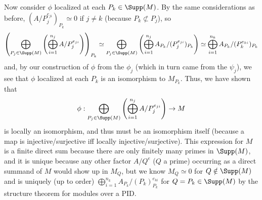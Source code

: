 \documentclass[11pt]{article}
\begin{document}
Now consider $\phi$ localized at each $P_k\in\Supp(M)$. By the same considerations as before, $(A/P_j^{e_{ji}})_{P_k}\simeq0$ if $j\neq k$ (because $P_k\not\subset P_j$), so
\[\left(\bigoplus_{P_j\in\Supp(M)}\left(\bigoplus_{i=1}^{n_j} A/P_j^{e_{ji}}\right)\right)_{P_k}\simeq\bigoplus_{P_j\in\Supp(M)}\left(\bigoplus_{i=1}^{n_j} A_{P_k}/(P_j^{e_{ji}})_{P_k}\right)\simeq\bigoplus_{i=1}^{n_k} A_{P_k}/(P_k^{e_{ki}})_{P_k} \]
and, by our construction of $\phi$ from the $\phi_j$ (which in turn came from the $\psi_j$), we see that $\phi$ localized at each $P_k$ is an isomorphism to $M_{P_k}$. Thus, we have shown that
\[\phi:\bigoplus_{P_j\in\Supp(M)}\left(\bigoplus_{i=1}^{n_j} A/P_j^{e_{ji}}\right)\rightarrow M\]
is locally an isomorphism, and thus must be an isomorphism itself (because a map is injective/surjective iff locally injective/surjective). This expression for $M$ is a finite direct sum because there are only finitely many primes in $\Supp(M)$, and it is unique because any other factor $A/Q^e$ ($Q$ a prime) occurring as a direct summand of $M$ would show up in $M_Q$, but we know $M_Q\simeq0$ for $Q\notin \Supp(M)$ and is uniquely (up to order) $\bigoplus_{i=1}^{n_k} A_{P_k}/(P_k)_{P_k}^{e_{ki}}$ for $Q=P_k\in\Supp(M)$ by the structure theorem for modules over a PID. \\

%
\end{document}
